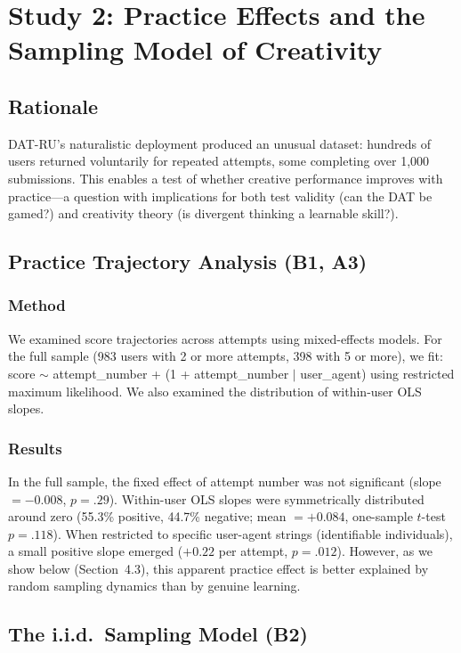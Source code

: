 \documentclass[12pt]{article}
\begin{document}
\section{Study 2: Practice Effects and the Sampling Model of Creativity}

\subsection{Rationale}

DAT-RU's naturalistic deployment produced an unusual dataset: hundreds of users returned voluntarily for repeated attempts, some completing over 1,000 submissions. This enables a test of whether creative performance improves with practice---a question with implications for both test validity (can the DAT be gamed?) and creativity theory (is divergent thinking a learnable skill?).

\subsection{Practice Trajectory Analysis (B1, A3)}

\subsubsection{Method}

We examined score trajectories across attempts using mixed-effects models. For the full sample (983 users with 2 or more attempts, 398 with 5 or more), we fit: score $\sim$ attempt\_number + (1 + attempt\_number $|$ user\_agent) using restricted maximum likelihood. We also examined the distribution of within-user OLS slopes.

\subsubsection{Results}

In the full sample, the fixed effect of attempt number was not significant (slope $= -0.008$, $p = .29$). Within-user OLS slopes were symmetrically distributed around zero (55.3\% positive, 44.7\% negative; mean $= +0.084$, one-sample $t$-test $p = .118$). When restricted to specific user-agent strings (identifiable individuals), a small positive slope emerged ($+0.22$ per attempt, $p = .012$). However, as we show below (Section~4.3), this apparent practice effect is better explained by random sampling dynamics than by genuine learning.

\subsection{The i.i.d.\ Sampling Model (B2)}
\end{document}
